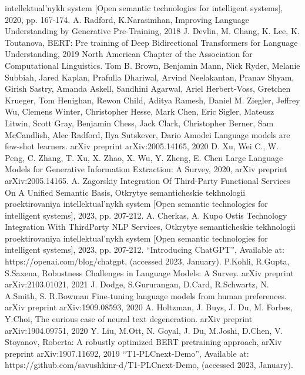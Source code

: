 \documentclass[11pt,final]{article}
\begin{document}
    \newpage

    \begin{multicols}{2}

        \renewcommand{\refname}{}
        {\scriptsize\begin{thebibliography}{12} \setcounter{enumiv}{10}
        \setlength{\parskip}{-3.5pt}

            \item[] intellektual’nykh system [Open semantic technologies for intelligent systems], 2020, pp. 167-174.
            \bibitem{}A. Radford, K.Narasimhan, Improving Language Understanding by Generative Pre-Training, 2018
            \bibitem{} J. Devlin, M. Chang, K. Lee, K. Toutanova, BERT: Pre training of Deep Bidirectional Transformers for Language Understanding, 2019 North American Chapter of the Association for Computational Linguistics.
            \bibitem{} Tom B. Brown, Benjamin Mann, Nick Ryder, Melanie Subbiah, Jared Kaplan, Prafulla Dhariwal, Arvind Neelakantan, Pranav Shyam, Girish Sastry, Amanda Askell, Sandhini Agarwal, Ariel Herbert-Voss, Gretchen Krueger, Tom Henighan, Rewon Child, Aditya Ramesh, Daniel M. Ziegler, Jeffrey Wu, Clemens Winter, Christopher Hesse, Mark Chen, Eric Sigler, Mateusz Litwin, Scott Gray, Benjamin Chess, Jack Clark, Christopher Berner, Sam McCandlish, Alec Radford, Ilya Sutskever, Dario Amodei Language models are few-shot learners. arXiv preprint arXiv:2005.14165, 2020
            \bibitem{} D. Xu, Wei C., W. Peng, C. Zhang, T. Xu, X. Zhao, X. Wu, Y. Zheng, E. Chen Large Language Models for Generative Information Extraction: A Survey, 2020, arXiv preprint arXiv:2005.14165.
            \bibitem{} A. Zagorskiy Integration Of Third-Party Functional Services On A Unified Semantic Basis, Otkrytye semanticheskie tekhnologii proektirovaniya intellektual’nykh system [Open semantic technologies for intelligent systems], 2023, pp. 207-212.
            \bibitem{} A. Cherkas, A. Kupo Ostis Technology Integration With ThirdParty NLP Services, Otkrytye semanticheskie tekhnologii proektirovaniya intellektual’nykh system [Open semantic technologies for intelligent systems], 2023, pp. 207-212.
            \bibitem{} “Introducing ChatGPT”, Available at: https://openai.com/blog/chatgpt, (accessed 2023, January).
            \bibitem{} P.Kohli, R.Gupta, S.Saxena, Robustness Challenges in Language Models: A Survey. arXiv preprint arXiv:2103.01021, 2021
            \bibitem{} J. Dodge, S.Gururangan, D.Card, R.Schwartz, N. A.Smith, S. R.Bowman Fine-tuning language models from human preferences. arXiv preprint arXiv:1909.08593, 2020
            \bibitem{} A. Holtzman, J. Buys, J. Du, M. Forbes, Y.Choi, The curious case of neural text degeneration. arXiv preprint arXiv:1904.09751, 2020
            \bibitem{} Y. Liu, M.Ott, N. Goyal, J. Du, M.Joshi, D.Chen, V. Stoyanov, Roberta: A robustly optimized BERT pretraining approach, arXiv preprint arXiv:1907.11692, 2019
            \bibitem{} “T1-PLCnext-Demo”, Available at: https://github.com/savushkinr-d/T1-PLCnext-Demo, (accessed 2023, January).
        \end{thebibliography}}
        

\end{multicols}
\end{document}
